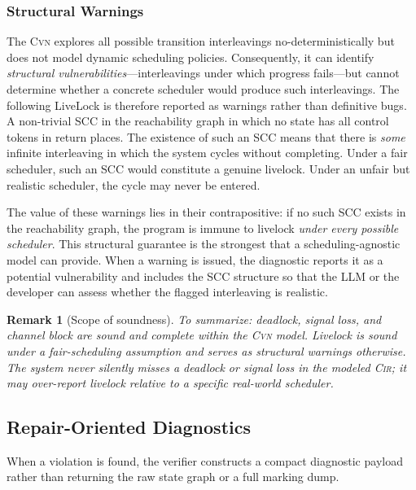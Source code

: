 \documentclass[sigconf]{acmart}
\newtheorem{remark}{Remark}
\begin{document}
\subsubsection{Structural Warnings}

The \textsc{Cvn} explores all possible transition interleavings no-deterministically but does not model dynamic scheduling policies. Consequently, it can identify \emph{structural vulnerabilities}---interleavings under which progress fails---but cannot determine whether a concrete scheduler would produce such interleavings. The following LiveLock is therefore reported as warnings rather than definitive bugs. A non-trivial SCC in the reachability graph in which no state has all control tokens in return places. The existence of such an SCC means that there is \emph{some} infinite interleaving in which the system cycles without completing. Under a fair scheduler, such an SCC would constitute a genuine livelock. Under an unfair but realistic scheduler, the cycle may never be entered.


\noindent
The value of these warnings lies in their contrapositive: if no such SCC exists in the reachability graph, the program is immune to livelock \emph{under every possible scheduler}. This structural guarantee is the strongest that a scheduling-agnostic model can provide. When a warning is issued, the diagnostic reports it as a potential vulnerability and includes the SCC structure so that the LLM or the developer can assess whether the flagged interleaving is realistic.

\begin{remark}[Scope of soundness]
\label{rem:soundness-scope}
To summarize: deadlock, signal loss, and channel block are \emph{sound and complete within the \textsc{Cvn} model}. Livelock is \emph{sound under a fair-scheduling assumption} and serves as \emph{structural warnings} otherwise. The system never silently misses a deadlock or signal loss in the modeled \textsc{Cir}; it may over-report livelock relative to a specific real-world scheduler.
\end{remark}


\subsection{Repair-Oriented Diagnostics}
\label{subsec:counterexample}

When a violation is found, the verifier constructs a compact diagnostic payload rather than returning the raw state graph or a full marking dump.
\end{document}

